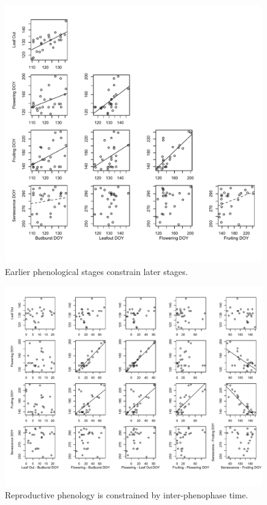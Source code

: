 \documentclass{article}
\begin{document}
  \begin{figure}[h]
  \centering
  \includegraphics{../analyses/figures/latevearly.pdf}
  \caption{Earlier phenological stages constrain later stages.}
  \label{fig:latevearly}
\end{figure}
\begin{figure}[h]
  \centering
  \includegraphics{../analyses/figures/adj_stagesmegaplot.pdf}
  \caption{Reproductive phenology is constrained by inter-phenophase time.}
  \label{fig:inter}
   \end{figure}
\end{document}
